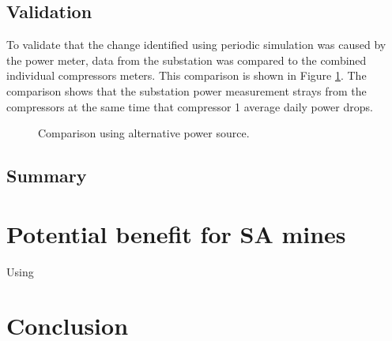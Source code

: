    \subsection{Validation}
   To validate that the change identified using periodic simulation was caused by the power meter, data from the substation was compared to the combined individual compressors meters. This comparison is shown in Figure \ref{fig: Corrected Periodic simulation}. The comparison shows that the substation power measurement strays from the compressors at the same time that compressor 1 average daily power drops.
	\begin{figure}[h]
		\centering
		\fbox{}
		\caption{Comparison using alternative power source.}
		\label{fig: Corrected Periodic simulation}
	\end{figure}    
	
	\subsection{Summary}
\newpage
\section{Potential benefit for SA mines}

	Using  
\section{Conclusion}